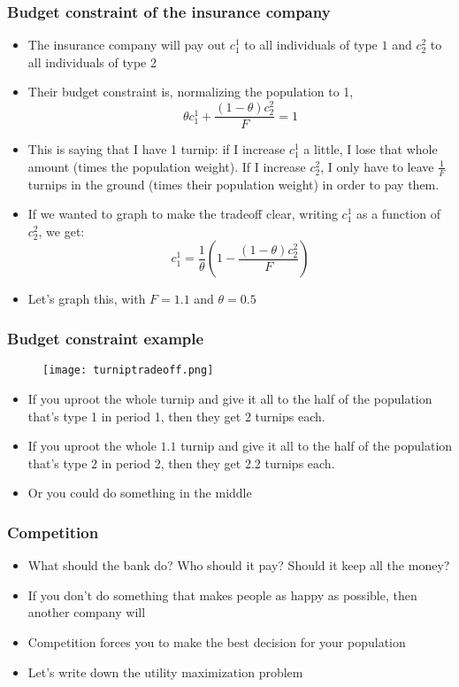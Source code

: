 \documentclass{beamer}
\begin{document}
\begin{frame}
\frametitle{Budget constraint of the insurance company}
\begin{itemize}
\item<1-> The insurance company will pay out $c_1^1$ to all individuals of type $1$ and $c_2^2$ to all individuals of type 2
\bigskip
\item<2-> Their budget constraint is, normalizing the population to 1,
$$\theta c_1^1 + \frac{(1-\theta)c_2^2}{F}=1$$
\bigskip
\item<3-> This is saying that I have 1 turnip: if I increase $c_1^1$ a little, I lose that whole amount (times the population weight).  If I increase $c_2^2$, I only have to leave $\frac{1}{F}$ turnips in the ground (times their population weight) in order to pay them.
\bigskip
\item<4-> If we wanted to graph to make the tradeoff clear, writing $c_1^1$ as a function of $c_2^2$, we get: 
$$c_1^1=\frac{1}{\theta}\left(1- \frac{(1-\theta)c_2^2}{F}\right)$$
\item<5-> Let's graph this, with $F=1.1$ and $\theta=0.5$
\end{itemize}
\end{frame}

\begin{frame}
\frametitle{Budget constraint example}
\begin{figure}
\centering
\texttt{[image: turniptradeoff.png]}
\end{figure}
\begin{itemize}
\item<2-> If you uproot the whole turnip and give it all to the half of the population that's type 1 in period 1, then they get 2 turnips each.
\smallskip 
\item<3-> If you uproot the whole $1.1$ turnip and give it all to the half of the population that's type 2 in period 2, then they get 2.2 turnips each.
\smallskip
\item<4-> Or you could do something in the middle
\end{itemize}
\end{frame}

\begin{frame}
\frametitle{Competition}
\begin{itemize}
\item<1->  What should the bank do?  Who should it pay?  Should it keep all the money?
\bigskip
\item<2-> If you don't do something that makes people as happy as possible, then another company will
\bigskip
\item<3-> Competition forces you to make the best decision for your population
\bigskip
\item<4-> Let's write down the utility maximization problem
\end{itemize}
\end{frame}
\end{document}
